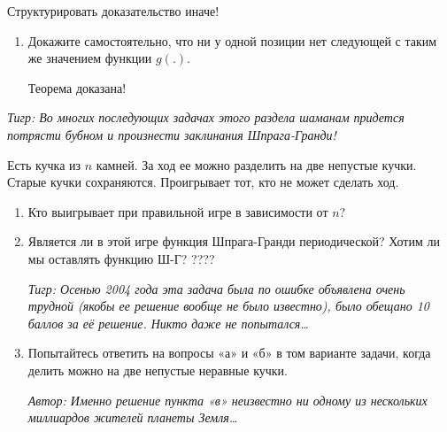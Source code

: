 \begin{problem} {\red  Структурировать доказательство иначе!}
\begin{enumerate}
Т.е. у любой позиции есть следующая с любым меньшим значением функции  $g\left(.\right)$.\par
\item	Докажите самостоятельно, что ни у одной позиции нет следующей с таким же значением функции  $g\left(.\right)$.\par
Теорема доказана!\par
\end{enumerate}
{\it Тигр: Во многих последующих задачах этого раздела  шаманам придется потрясти бубном и произнести заклинания Шпрага-Гранди!}




\begin{sol}

\end{sol}
\end{problem}




\begin{problem}
Есть кучка из  $n$  камней. За ход ее можно разделить на две непустые кучки. Старые кучки сохраняются. Проигрывает тот, кто не может сделать ход. \par
\begin{enumerate}
\item 	Кто выигрывает при правильной игре в зависимости от $n$?\par
\item 	Является ли в этой игре функция Шпрага-Гранди периодической? {\red Хотим ли мы оставлять функцию Ш-Г?} ????\par
{\it Тигр: Осенью 2004 года эта задача была по ошибке объявлена очень трудной (якобы ее решение вообще не было известно), было обещано 10 баллов за её решение. Никто даже не попытался\ldots }\par
\item 	Попытайтесь ответить на вопросы «а» и «б» в том варианте задачи, когда делить можно на две непустые неравные кучки.\par
{\it Автор: Именно решение пункта «в» неизвестно ни одному из нескольких миллиардов жителей планеты Земля\ldots }\par
\end{enumerate}


\begin{sol}

\end{sol}
\end{problem}




